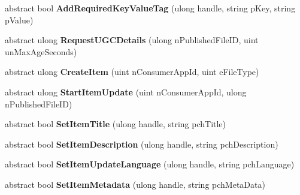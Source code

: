 \begin{DoxyCompactItemize}
\item 
\hypertarget{classValve_1_1Steamworks_1_1ISteamUGC_a145feefdc0d09afde80d0f590ee5e23b}{}abstract bool {\bfseries Add\+Required\+Key\+Value\+Tag} (ulong handle, string p\+Key, string p\+Value)\label{classValve_1_1Steamworks_1_1ISteamUGC_a145feefdc0d09afde80d0f590ee5e23b}

\item 
\hypertarget{classValve_1_1Steamworks_1_1ISteamUGC_ad6f931d4eaf5408fe973ec11cc8a1ab5}{}abstract ulong {\bfseries Request\+U\+G\+C\+Details} (ulong n\+Published\+File\+I\+D, uint un\+Max\+Age\+Seconds)\label{classValve_1_1Steamworks_1_1ISteamUGC_ad6f931d4eaf5408fe973ec11cc8a1ab5}

\item 
\hypertarget{classValve_1_1Steamworks_1_1ISteamUGC_a80d4eb9c577bb96c08d3caf61ec267e4}{}abstract ulong {\bfseries Create\+Item} (uint n\+Consumer\+App\+Id, uint e\+File\+Type)\label{classValve_1_1Steamworks_1_1ISteamUGC_a80d4eb9c577bb96c08d3caf61ec267e4}

\item 
\hypertarget{classValve_1_1Steamworks_1_1ISteamUGC_ace761f860ad25d731128f5f51adc7765}{}abstract ulong {\bfseries Start\+Item\+Update} (uint n\+Consumer\+App\+Id, ulong n\+Published\+File\+I\+D)\label{classValve_1_1Steamworks_1_1ISteamUGC_ace761f860ad25d731128f5f51adc7765}

\item 
\hypertarget{classValve_1_1Steamworks_1_1ISteamUGC_a1b98a0a29af0665d85fb0daf87387824}{}abstract bool {\bfseries Set\+Item\+Title} (ulong handle, string pch\+Title)\label{classValve_1_1Steamworks_1_1ISteamUGC_a1b98a0a29af0665d85fb0daf87387824}

\item 
\hypertarget{classValve_1_1Steamworks_1_1ISteamUGC_a6f03670294cd1e38fe18e196e811c695}{}abstract bool {\bfseries Set\+Item\+Description} (ulong handle, string pch\+Description)\label{classValve_1_1Steamworks_1_1ISteamUGC_a6f03670294cd1e38fe18e196e811c695}

\item 
\hypertarget{classValve_1_1Steamworks_1_1ISteamUGC_a57daaf283f40de7e53d3aa2d8889361e}{}abstract bool {\bfseries Set\+Item\+Update\+Language} (ulong handle, string pch\+Language)\label{classValve_1_1Steamworks_1_1ISteamUGC_a57daaf283f40de7e53d3aa2d8889361e}

\item 
\hypertarget{classValve_1_1Steamworks_1_1ISteamUGC_a695bcb1ea8d46c66c0a6fbc5d86fb598}{}abstract bool {\bfseries Set\+Item\+Metadata} (ulong handle, string pch\+Meta\+Data)\label{classValve_1_1Steamworks_1_1ISteamUGC_a695bcb1ea8d46c66c0a6fbc5d86fb598}


\end{DoxyCompactItemize}
